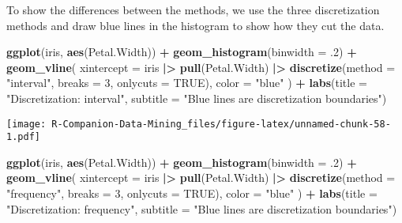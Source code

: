 \documentclass[
  notitlepage]{book}
\newenvironment{Shaded}{\begin{snugshade}}{\end{snugshade}}
\newcommand{\DataTypeTok}[1]{\textcolor[rgb]{0.13,0.29,0.53}{#1}}
\newcommand{\DecValTok}[1]{\textcolor[rgb]{0.00,0.00,0.81}{#1}}
\newcommand{\ErrorTok}[1]{\textcolor[rgb]{0.64,0.00,0.00}{\textbf{#1}}}
\newcommand{\FloatTok}[1]{\textcolor[rgb]{0.00,0.00,0.81}{#1}}
\newcommand{\KeywordTok}[1]{\textcolor[rgb]{0.13,0.29,0.53}{\textbf{#1}}}
\newcommand{\NormalTok}[1]{#1}
\newcommand{\OperatorTok}[1]{\textcolor[rgb]{0.81,0.36,0.00}{\textbf{#1}}}
\newcommand{\OtherTok}[1]{\textcolor[rgb]{0.56,0.35,0.01}{#1}}
\newcommand{\StringTok}[1]{\textcolor[rgb]{0.31,0.60,0.02}{#1}}
\begin{document}
To show the differences between the methods, we use the three
discretization methods and draw blue lines in the histogram to show
how they cut the data.

\begin{Shaded}
\begin{Highlighting}[]
\KeywordTok{ggplot}\NormalTok{(iris, }\KeywordTok{aes}\NormalTok{(Petal.Width)) }\OperatorTok{+}\StringTok{ }\KeywordTok{geom\_histogram}\NormalTok{(}\DataTypeTok{binwidth =} \FloatTok{.2}\NormalTok{) }\OperatorTok{+}
\StringTok{  }\KeywordTok{geom\_vline}\NormalTok{(}
      \DataTypeTok{xintercept =}\NormalTok{ iris }\OperatorTok{|}\ErrorTok{\textgreater{}}\StringTok{ }
\StringTok{      }\KeywordTok{pull}\NormalTok{(Petal.Width) }\OperatorTok{|}\ErrorTok{\textgreater{}}\StringTok{ }
\StringTok{      }\KeywordTok{discretize}\NormalTok{(}\DataTypeTok{method =} \StringTok{"interval"}\NormalTok{, }\DataTypeTok{breaks =} \DecValTok{3}\NormalTok{, }\DataTypeTok{onlycuts =} \OtherTok{TRUE}\NormalTok{),}
    \DataTypeTok{color =} \StringTok{"blue"}
\NormalTok{  ) }\OperatorTok{+}
\StringTok{  }\KeywordTok{labs}\NormalTok{(}\DataTypeTok{title =} \StringTok{"Discretization: interval"}\NormalTok{, }
       \DataTypeTok{subtitle =} \StringTok{"Blue lines are discretization boundaries"}\NormalTok{)}
\end{Highlighting}
\end{Shaded}

\texttt{[image: R-Companion-Data-Mining\_files/figure-latex/unnamed-chunk-58-1.pdf]}

\begin{Shaded}
\begin{Highlighting}[]
\KeywordTok{ggplot}\NormalTok{(iris, }\KeywordTok{aes}\NormalTok{(Petal.Width)) }\OperatorTok{+}\StringTok{ }\KeywordTok{geom\_histogram}\NormalTok{(}\DataTypeTok{binwidth =} \FloatTok{.2}\NormalTok{) }\OperatorTok{+}
\StringTok{  }\KeywordTok{geom\_vline}\NormalTok{(}
    \DataTypeTok{xintercept =}\NormalTok{ iris }\OperatorTok{|}\ErrorTok{\textgreater{}}\StringTok{ }
\StringTok{    }\KeywordTok{pull}\NormalTok{(Petal.Width) }\OperatorTok{|}\ErrorTok{\textgreater{}}\StringTok{ }
\StringTok{    }\KeywordTok{discretize}\NormalTok{(}\DataTypeTok{method =} \StringTok{"frequency"}\NormalTok{, }\DataTypeTok{breaks =} \DecValTok{3}\NormalTok{, }\DataTypeTok{onlycuts =} \OtherTok{TRUE}\NormalTok{),}
   \DataTypeTok{color =} \StringTok{"blue"}
\NormalTok{  ) }\OperatorTok{+}
\StringTok{  }\KeywordTok{labs}\NormalTok{(}\DataTypeTok{title =} \StringTok{"Discretization: frequency"}\NormalTok{, }
       \DataTypeTok{subtitle =} \StringTok{"Blue lines are discretization boundaries"}\NormalTok{)}
\end{Highlighting}
\end{Shaded}
\end{document}
